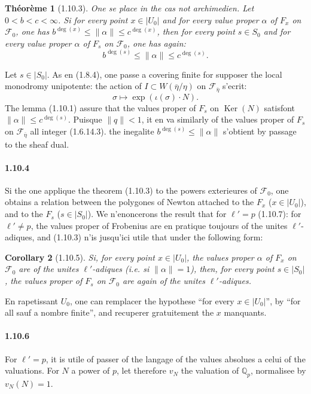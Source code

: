 \documentclass[12pt,a4paper]{article}
\theoremstyle{plain}
\newtheorem{theorem}{Th\'eor\`eme}[section]
\newtheorem{corollary}[theorem]{Corollary}
\theoremstyle{definition}
\theoremstyle{remark}
\DeclareMathOperator{\Ker}{Ker}
\newcommand{\QQ}{{\mathbb{Q}}}
\begin{document}
\begin{theorem}[1.10.3]
One se place in the cas not archimedien. Let $0 < b < c < \infty$. Si for every point $x \in |U_0|$ and for every value proper $\alpha$ of $F_x$ on $\mathscr{F}_0$, one has $b^{\deg(x)} \leq \|\alpha\| \leq c^{\deg(x)}$, then for every point $s \in S_0$ and for every value proper $\alpha$ of $F_s$ on $\mathscr{F}_0$, one has again:
\[ b^{\deg(s)} \leq \|\alpha\| \leq c^{\deg(s)}. \]
\end{theorem}

Let $s \in |S_0|$. As en (1.8.4), one passe a covering finite for supposer the local monodromy unipotente: the action of $I \subset W(\overline{\eta}/\eta)$ on $\mathscr{F}_{\overline{\eta}}$ s'ecrit:
\[ \sigma \mapsto \exp(\iota(\sigma) \cdot N). \]
The lemma (1.10.1) assure that the values proper of $F_s$ on $\Ker(N)$ satisfont $\|\alpha\| \leq c^{\deg(s)}$. Puisque $\|q\| < 1$, it en va similarly of the values proper of $F_s$ on $\mathscr{F}_{\overline{\eta}}$ all integer (1.6.14.3). the inegalite $b^{\deg(s)} \leq \|\alpha\|$ s'obtient by passage to the sheaf dual.

\paragraph{1.10.4}
Si the one applique the theorem (1.10.3) to the powers exterieures of $\mathscr{F}_0$, one obtains a relation between the polygones of Newton attached to the $F_x$ ($x \in |U_0|$), and to the $F_s$ ($s \in |S_0|$). We n'enoncerons the result that for $\ell' = p$ (1.10.7): for $\ell' \neq p$, the values proper of Frobenius are en pratique toujours of the unites $\ell'$-adiques, and (1.10.3) n'is jusqu'ici utile that under the following form:


\begin{corollary}[1.10.5]
Si, for every point $x \in |U_0|$, the values proper $\alpha$ of $F_x$ on $\mathscr{F}_0$ are of the unites $\ell'$-adiques (i.e. si $\|\alpha\| = 1$), then, for every point $s \in |S_0|$, the values proper of $F_s$ on $\mathscr{F}_0$ are again of the unites $\ell'$-adiques.
\end{corollary}

En rapetissant $U_0$, one can remplacer the hypothese ``for every $x \in |U_0|$'', by ``for all sauf a nombre finite'', and recuperer gratuitement the $x$ manquants.

\paragraph{1.10.6}
For $\ell' = p$, it is utile of passer of the langage of the values absolues a celui of the valuations. For $N$ a power of $p$, let therefore $v_N$ the valuation of $\QQ_p$, normalisee by $v_N(N) = 1$.
\end{document}
